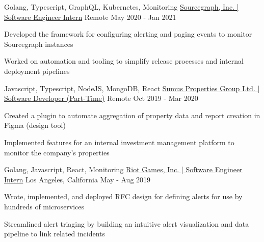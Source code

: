 

\begin{cventries}

  \cventry
    {Golang, Typescript, GraphQL, Kubernetes, Monitoring} %
    {\href{https://bobheadxi.dev/experience/sourcegraph-intern}{Sourcegraph, Inc. | Software Engineer Intern}} %
    {Remote} %
    {May 2020 - Jan 2021} %
    {
      \begin{cvitems} %
        \item {Developed the framework for configuring alerting and paging events to monitor Sourcegraph instances}
        \item {Worked on automation and tooling to simplify release processes and internal deployment pipelines}
      \end{cvitems}
    }

  \cventry
    {Javascript, Typescript, NodeJS, MongoDB, React} %
    {\href{https://bobheadxi.dev/experience/sumus}{Sumus Properties Group Ltd. | Software Developer (Part-Time)}} %
    {Remote} %
    {Oct 2019 - Mar 2020} %
    {
      \begin{cvitems} %
        \item {Created a plugin to automate aggregation of property data and report creation in Figma (design tool)}
        \item {Implemented features for an internal investment management platform to monitor the company's properties}
      \end{cvitems}
    }


  \cventry
    {Golang, Javascript, React, Monitoring} %
    {\href{https://bobheadxi.dev/experience/riot-games}{Riot Games, Inc. | Software Engineer Intern}} %
    {Los Angeles, California} %
    {May - Aug 2019} %
    {
      \begin{cvitems} %
        \item {Wrote, implemented, and deployed RFC design for defining alerts for use by hundreds of microservices}
        \item {Streamlined alert triaging by building an intuitive alert visualization and data pipeline to link related incidents}
      \end{cvitems}
    }


\end{cventries}
